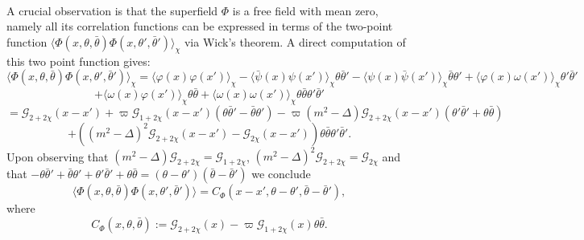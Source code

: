\documentclass[a4paper,10pt]{article}
\newcommand{\assign}{:=}
\begin{document}
\

A crucial observation is that the superfield $\Phi$ is a free field with mean
zero, namely all its correlation functions can be expressed in terms of the
two-point function $\langle \Phi (x, \theta, \bar{\theta}) \Phi (x, \theta',
\bar{\theta}') \rangle_{\chi}$ via Wick's theorem. A direct computation of
this two point function gives:
\[ \langle \Phi (x, \theta, \bar{\theta}) \Phi (x, \theta', \bar{\theta}')
   \rangle_{\chi} = \langle \varphi (x) \varphi (x') \rangle_{\chi} - \langle
   \bar{\psi} (x) \psi (x') \rangle_{\chi} \theta \bar{\theta}' - \langle \psi
   (x) \bar{\psi} (x') \rangle_{\chi} \bar{\theta} \theta' + \langle \varphi
   (x) \omega (x') \rangle_{\chi} \theta' \bar{\theta}' \]
\[ + \langle \omega (x) \varphi (x') \rangle_{\chi} \theta \bar{\theta} +
   \langle \omega (x) \omega (x') \rangle_{\chi} \theta \bar{\theta} \theta'
   \bar{\theta}' \]
\[ =\mathcal{G}_{2 + 2 \chi} (x - x') + \varpi \mathcal{G}_{1 + 2 \chi} (x -
   x') (\theta \bar{\theta}' - \bar{\theta} \theta') - \varpi (m^2 - \Delta)
   \mathcal{G}_{2 + 2 \chi} (x - x') (\theta' \bar{\theta}' + \theta
   \bar{\theta}) \]
\[ + ((m^2 - \Delta)^2 \mathcal{G}_{2 + 2 \chi} (x - x') -\mathcal{G}_{2 \chi}
   (x - x')) \theta \bar{\theta} \theta' \bar{\theta}' . \]
Upon observing that $(m^2 - \Delta) \mathcal{G}_{2 + 2 \chi} =\mathcal{G}_{1 +
2 \chi}$, $(m^2 - \Delta)^2 \mathcal{G}_{2 + 2 \chi} =\mathcal{G}_{2 \chi}$
and that $- \theta \bar{\theta}' + \bar{\theta} \theta' + \theta'
\bar{\theta}' + \theta \bar{\theta} = (\theta - \theta') (\bar{\theta} -
\bar{\theta}')$ we conclude
\begin{equation}
  \langle \Phi (x, \theta, \bar{\theta}) \Phi (x, \theta', \bar{\theta}')
  \rangle = C_{\Phi} (x - x', \theta - \theta', \bar{\theta} - \bar{\theta}'),
  \label{eq:correlation}
\end{equation}
where
\[ C_{\Phi} (x, \theta, \bar{\theta}) \assign \mathcal{G}_{2 + 2 \chi} (x) -
   \varpi \mathcal{G}_{1 + 2 \chi} (x) \theta \bar{\theta} . \]
\end{document}
